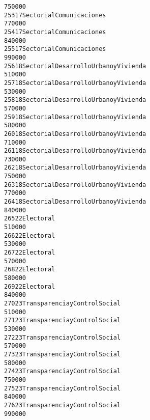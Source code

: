 \documentclass[letterpaper,10pt,english]{/usr/local/lib/python2.7/dist-packages/sphinx/texinputs/sphinxhowto}
\newenvironment{InvisibleVerbatim}
        {\begin{mdframed}[leftmargin=0.1\linewidth,innerleftmargin=3pt,innerrightmargin=3pt, userdefinedwidth=1\linewidth, linewidth=0pt, linecolor=white, usetwoside=false]}
        {\end{mdframed}}
\begin{document}
\begin{InvisibleVerbatim}
\begin{alltt}
750000
253                17               Sectorial Comunicaciones
770000
254                17               Sectorial Comunicaciones
840000
255                17               Sectorial Comunicaciones
990000
256                18  Sectorial Desarrollo Urbano y Vivienda
510000
257                18  Sectorial Desarrollo Urbano y Vivienda
530000
258                18  Sectorial Desarrollo Urbano y Vivienda
570000
259                18  Sectorial Desarrollo Urbano y Vivienda
580000
260                18  Sectorial Desarrollo Urbano y Vivienda
710000
261                18  Sectorial Desarrollo Urbano y Vivienda
730000
262                18  Sectorial Desarrollo Urbano y Vivienda
750000
263                18  Sectorial Desarrollo Urbano y Vivienda
770000
264                18  Sectorial Desarrollo Urbano y Vivienda
840000
265                22                               Electoral
510000
266                22                               Electoral
530000
267                22                               Electoral
570000
268                22                               Electoral
580000
269                22                               Electoral
840000
270                23          Transparencia y Control Social
510000
271                23          Transparencia y Control Social
530000
272                23          Transparencia y Control Social
570000
273                23          Transparencia y Control Social
580000
274                23          Transparencia y Control Social
750000
275                23          Transparencia y Control Social
840000
276                23          Transparencia y Control Social
990000


\end{alltt}
\end{InvisibleVerbatim}
\end{document}
